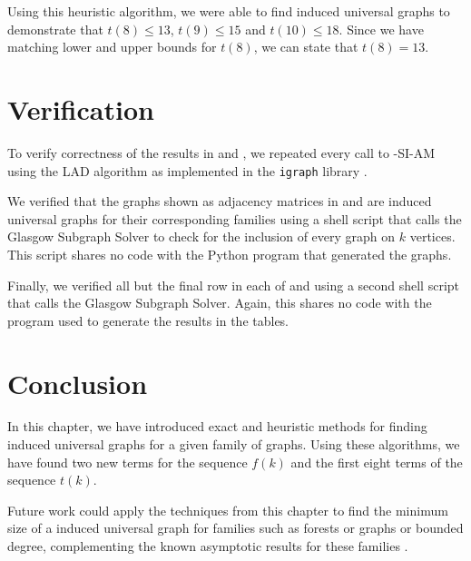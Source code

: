 Using this heuristic algorithm, we were able to find induced universal graphs
to demonstrate that $t(8) \leq 13$, $t(9) \leq 15$ and $t(10) \leq 18$.
Since we have matching lower and upper bounds for $t(8)$, we can state
that $t(8) = 13$.

\section{Verification}\label{sec:verification}

To verify correctness of the results in
 and , we repeated every call to
\McSplit-SI-AM using the LAD algorithm \citep{DBLP:journals/ai/Solnon10}
as implemented in the \texttt{igraph} library \citep{igraph}.

We verified that the graphs shown as adjacency matrices in 
and  are induced universal graphs for their corresponding families
using a shell script that calls the Glasgow Subgraph Solver
\citep{DBLP:conf/cp/McCreeshP15,DBLP:conf/gg/McCreeshP020} to check for the
inclusion of every graph on $k$ vertices.
This script shares no code with the Python program that generated the graphs.

Finally, we verified all but the final row in each of 
and  using a second shell script that calls the Glasgow
Subgraph Solver.  Again, this shares no code with the program used to generate
the results in the tables.

\section{Conclusion}

In this chapter, we have introduced exact and heuristic methods for
finding induced universal graphs for a given family of graphs.  Using these algorithms,
we have found two new terms for the sequence $f(k)$ and the first eight terms
of the sequence $t(k)$.

Future work could apply the techniques from this chapter to find
the minimum size of a induced universal graph for families such as
forests or graphs or bounded degree, complementing the known asymptotic
results for these families \citep{DBLP:journals/jacm/AlstrupDK17,
DBLP:conf/icalp/AbrahamsenAHKS17}.
